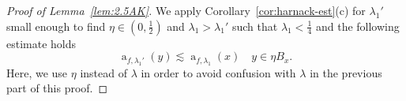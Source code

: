 \documentclass[11pt,a4paper,reqno]{amsart}
\theoremstyle{definition}
\renewcommand{\a}{\operatorname{a}}
\newcommand{\ud}{\mathrm {d}}
\numberwithin{komcounter}{section}
\begin{document}
\begin{proof}[Proof of Lemma~\ref{lem:2.5AK}]
We apply Corollary~\ref{cor:harnack-est}(c) for $\lambda_1'$ small enough to find $\eta\in(0,\frac12)$ and $\lambda_1>\lambda_1'$ such that $\lambda_1<\frac14$ and the following estimate holds 
\begin{equation}
 \a_{f,\lambda_1'}(y)\lesssim \a_{f,\lambda_1}(x)\quad y\in \eta B_x. \label{aux333-lem32}
\end{equation}
 Here, we use $\eta$ instead of $\lambda$ in order to avoid confusion with $\lambda$ in the previous part of this proof.
  

\end{proof}
\end{document}
